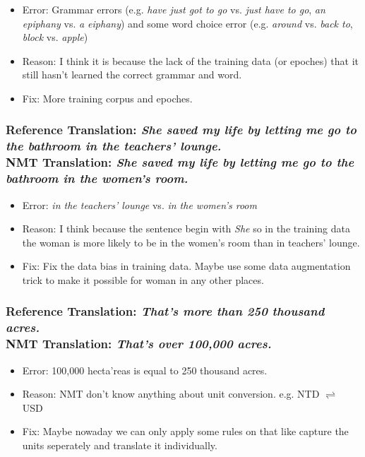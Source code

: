 \documentclass[12pt, letterpaper]{article}
\begin{document}
\begin{itemize}
  \item Error: Grammar errors (e.g. \textit{have just got to go} vs. \textit{just have to go}, \textit{an epiphany} vs. \textit{a eiphany}) and some word choice error (e.g. \textit{around} vs. \textit{back to}, \textit{block} vs. \textit{apple})
  \item Reason: I think it is because the lack of the training data (or epoches) that it still hasn't learned the correct grammar and word.
  \item Fix: More training corpus and epoches.
\end{itemize}

\subsubsection{\textbf{Reference Translation}: \textit{She saved my life by letting me go to the bathroom in the teachers’ lounge.} \\ \textbf{NMT Translation}: \textit{She saved my life by letting me go to the bathroom in the women’s room.}}

\begin{itemize}
  \item Error: \textit{in the teachers’ lounge} vs. \textit{in the women’s room}
  \item Reason: I think because the sentence begin with \textit{She} so in the training data the woman is more likely to be in the women's room than in teachers' lounge.
  \item Fix: Fix the data bias in training data. Maybe use some data augmentation trick to make it possible for woman in any other places.
\end{itemize}

\subsubsection{\textbf{Reference Translation}: \textit{That’s more than 250 thousand acres.} \\ \textbf{NMT Translation}: \textit{That’s over 100,000 acres.}}

\begin{itemize}
  \item Error: 100,000 hecta'reas is equal to 250 thousand acres.
  \item Reason: NMT don't know anything about unit conversion. e.g. NTD $\rightleftharpoons$ USD
  \item Fix: Maybe nowaday we can only apply some rules on that like capture the units seperately and translate it individually.
\end{itemize}
\end{document}
